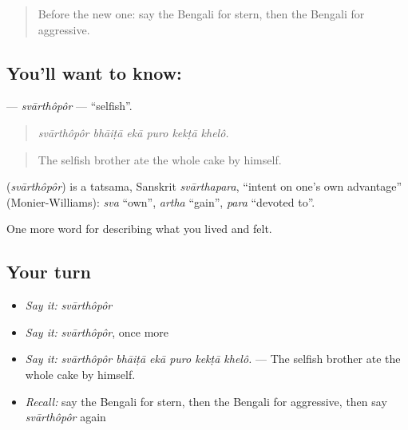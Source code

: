 \begin{quote}
Before the new one: say the Bengali for stern, then the Bengali for aggressive.
\end{quote}

\subsection*{You'll want to know: }
\textbf{} — \emph{svārthôpôr} — \textquotedblleft{}selfish\textquotedblright{}.

\begin{quote}
     
\end{quote}

\begin{quote}
\emph{svārthôpôr bhāiṭā ekā puro kekṭā khelô.}
\end{quote}

\begin{quote}
The selfish brother ate the whole cake by himself.
\end{quote}

\begin{cousinweb}
\textbf{} (\emph{svārthôpôr}) is a tatsama, Sanskrit \emph{svārthapara}, \textquotedblleft{}intent on one's own advantage\textquotedblright{} (Monier-Williams): \emph{sva} \textquotedblleft{}own\textquotedblright{}, \emph{artha} \textquotedblleft{}gain\textquotedblright{}, \emph{para} \textquotedblleft{}devoted to\textquotedblright{}.
\end{cousinweb}

\begin{grammarlens}[title={What you've built}]
One more word for describing what you lived and felt.
\end{grammarlens}

\subsection*{Your turn}
\begin{itemize}
\raggedright
  \item \emph{Say it:} \emph{svārthôpôr}
  \item \emph{Say it:} \emph{svārthôpôr}, once more
  \item \emph{Say it:} \emph{svārthôpôr bhāiṭā ekā puro kekṭā khelô.} — The selfish brother ate the whole cake by himself.
  \item \emph{Recall:} say the Bengali for stern, then the Bengali for aggressive, then say \emph{svārthôpôr} again
\end{itemize}

